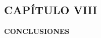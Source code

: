 \begin{center}
    \section*{CAPÍTULO VIII}
    \vspace*{0.5in}
    \textbf{CONCLUSIONES}
\end{center}

\newpage